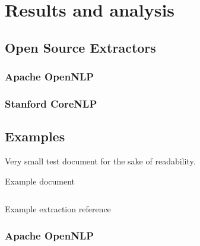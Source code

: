 \section{Results and analysis}
\label{sec:results}

\subsection{Open Source Extractors}

\subsubsection{Apache OpenNLP}

\subsubsection{Stanford CoreNLP}

\subsection{Examples}

Very small test document for the sake of readability.

\begin{listing}[H]
\texttt{}
\caption{Example document}
\label{lst:example-document}
\end{listing}

\begin{listing}[H]
\inputminted{xml}{reference.xml}
\caption{Example extraction reference}
\label{lst:example-reference}
\end{listing}

\newpage
\subsubsection{Apache OpenNLP}

